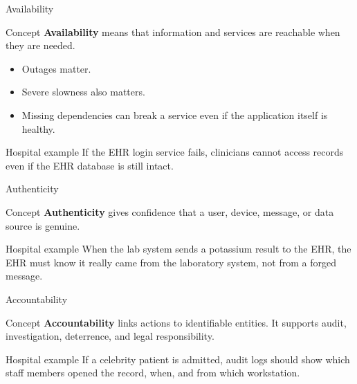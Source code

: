 \documentclass[presentation]{beamer}
\begin{document}
\begin{frame}[c]{Availability}
\begin{block}{Concept}
\textbf{Availability} means that information and services are reachable when they are needed.
\end{block}

\begin{itemize}
    \item Outages matter.
    \item Severe slowness also matters.
    \item Missing dependencies can break a service even if the application itself is healthy.
\end{itemize}

\begin{exampleblock}{Hospital example}
If the EHR login service fails, clinicians cannot access records even if the EHR database is
still intact.
\end{exampleblock}
\end{frame}

\begin{frame}[c]{Authenticity}
\begin{block}{Concept}
\textbf{Authenticity} gives confidence that a user, device, message, or data source is genuine.
\end{block}

\begin{exampleblock}{Hospital example}
When the lab system sends a potassium result to the EHR, the EHR must know it really came from
the laboratory system, not from a forged message.
\end{exampleblock}
\end{frame}

\begin{frame}[c]{Accountability}
\begin{block}{Concept}
\textbf{Accountability} links actions to identifiable entities. It supports audit, investigation,
deterrence, and legal responsibility.
\end{block}

\begin{exampleblock}{Hospital example}
If a celebrity patient is admitted, audit logs should show which staff members opened the record,
when, and from which workstation.
\end{exampleblock}
\end{frame}
\end{document}
